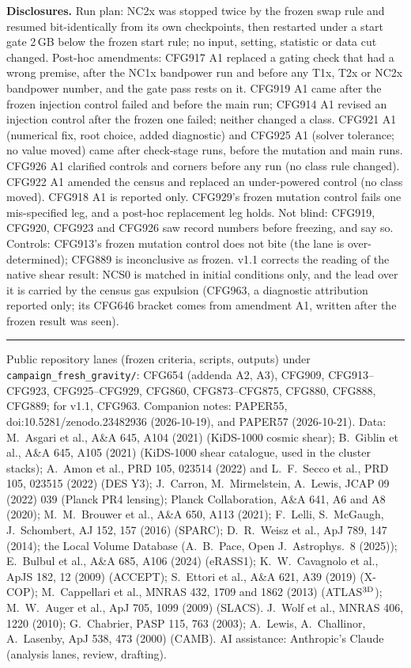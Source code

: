 \documentclass[10pt]{article}
\begin{document}
\textbf{Disclosures.} Run plan: NC2x was stopped twice by the frozen swap rule and resumed bit-identically from its own checkpoints, then restarted under a start gate 2\,GB below the frozen start rule; no input, setting, statistic or data cut changed. Post-hoc amendments: CFG917 A1 replaced a gating check that had a wrong premise, after the NC1x bandpower run and before any T1x, T2x or NC2x bandpower number, and the gate pass rests on it. CFG919 A1 came after the frozen injection control failed and before the main run; CFG914 A1 revised an injection control after the frozen one failed; neither changed a class. CFG921 A1 (numerical fix, root choice, added diagnostic) and CFG925 A1 (solver tolerance; no value moved) came after check-stage runs, before the mutation and main runs. CFG926 A1 clarified controls and corners before any run (no class rule changed). CFG922 A1 amended the census and replaced an under-powered control (no class moved). CFG918 A1 is reported only. CFG929's frozen mutation control fails one mis-specified leg, and a post-hoc replacement leg holds. Not blind: CFG919, CFG920, CFG923 and CFG926 saw record numbers before freezing, and say so. Controls: CFG913's frozen mutation control does not bite (the lane is over-determined); CFG889 is inconclusive as frozen. v1.1 corrects the reading of the native shear result: NCS0 is matched in initial conditions only, and the lead over it is carried by the census gas expulsion (CFG963, a diagnostic attribution reported only; its CFG646 bracket comes from amendment A1, written after the frozen result was seen).

\vspace{4pt}\hrule\vspace{3pt}
{\footnotesize
Public repository lanes (frozen criteria, scripts, outputs) under \texttt{campaign\_fresh\_gravity/}: CFG654 (addenda A2, A3), CFG909, CFG913--CFG923, CFG925--CFG929, CFG860, CFG873--CFG875, CFG880, CFG888, CFG889; for v1.1, CFG963.
Companion notes: PAPER55, doi:10.5281/zenodo.23482936 (2026-10-19), and PAPER57 (2026-10-21).
Data: M.~Asgari et al., A\&A 645, A104 (2021) (KiDS-1000 cosmic shear); B.~Giblin et al., A\&A 645, A105 (2021) (KiDS-1000 shear catalogue, used in the cluster stacks); A.~Amon et al., PRD 105, 023514 (2022) and L.~F.~Secco et al., PRD 105, 023515 (2022) (DES Y3); J.~Carron, M.~Mirmelstein, A.~Lewis, JCAP 09 (2022) 039 (Planck PR4 lensing); Planck Collaboration, A\&A 641, A6 and A8 (2020); M.~M.~Brouwer et al., A\&A 650, A113 (2021); F.~Lelli, S.~McGaugh, J.~Schombert, AJ 152, 157 (2016) (SPARC); D.~R.~Weisz et al., ApJ 789, 147 (2014); the Local Volume Database (A.~B.~Pace, Open J.\ Astrophys.\ 8 (2025)); E.~Bulbul et al., A\&A 685, A106 (2024) (eRASS1); K.~W.~Cavagnolo et al., ApJS 182, 12 (2009) (ACCEPT); S.~Ettori et al., A\&A 621, A39 (2019) (X-COP); M.~Cappellari et al., MNRAS 432, 1709 and 1862 (2013) (ATLAS$^{\rm 3D}$); M.~W.~Auger et al., ApJ 705, 1099 (2009) (SLACS).
J.~Wolf et al., MNRAS 406, 1220 (2010); G.~Chabrier, PASP 115, 763 (2003); A.~Lewis, A.~Challinor, A.~Lasenby, ApJ 538, 473 (2000) (CAMB).
AI assistance: Anthropic's Claude (analysis lanes, review, drafting).}
\end{document}
